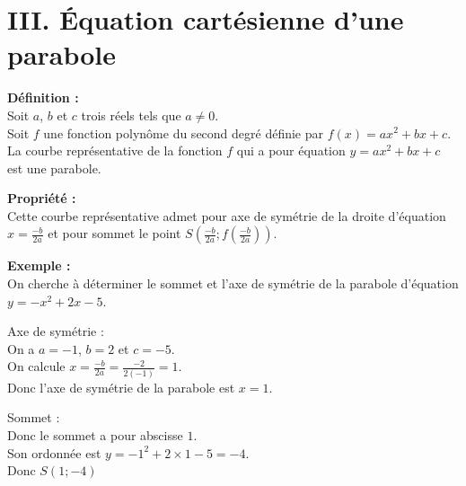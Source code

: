 \documentclass[11pt,a4paper]{article}
\begin{document}
\section*{III. Équation cartésienne d'une parabole}

\begin{mdframed}[style=definitionStyle]
  \textbf{Définition :} ~\\
  Soit $a$, $b$ et $c$ trois réels tels que $a\not=0$. \\
  Soit $f$ une fonction polynôme du second degré définie par $f(x)=ax^2+bx+c$. \\
  La courbe représentative de la fonction $f$ qui a pour équation $y=ax^2+bx+c$ est une parabole.
\end{mdframed}

\begin{mdframed}[style=proprieteStyle]
  \textbf{Propriété :} ~\\
  Cette courbe représentative admet pour axe de symétrie de la droite d'équation $\displaystyle x=\frac{-b}{2a}$ et pour sommet le point $\displaystyle S\left(\frac{-b}{2a};f\left(\frac{-b}{2a}\right)\right)$.
\end{mdframed}

\textbf{Exemple :} ~\\
On cherche à déterminer le sommet et l'axe de symétrie de la parabole d'équation $y=-x^2+2x-5$. \\

\begin{minipage}{0.5\textwidth}
  Axe de symétrie : \\
  On a $a=-1$, $b=2$ et $c=-5$. \\
  On calcule $\displaystyle x=\frac{-b}{2a}=\frac{-2}{2(-1)}=1$. \\
  Donc l'axe de symétrie de la parabole est $x=1$. \\
\end{minipage}
\hfill
\begin{minipage}{0.5\textwidth}
  Sommet : \\
  Donc le sommet a pour abscisse $1$. \\
  Son ordonnée est $y=-1^2+2\times1-5=-4$. \\
  Donc $S\left(1;-4\right)$
  \vspace*{20pt}
\end{minipage}
\end{document}
